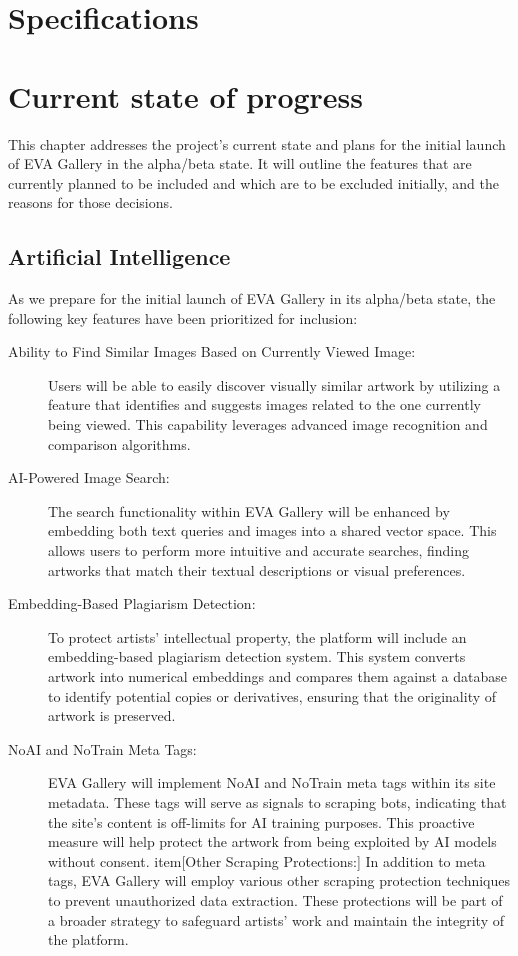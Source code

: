 \newpage

\chapter{Specifications}

\chapter{Current state of progress}
This chapter addresses the project's current state and plans for the initial launch of EVA Gallery in the alpha/beta state. It will outline the features that are currently planned to be included and which are to be excluded initially, and the reasons for those decisions.

\section{Artificial Intelligence}

As we prepare for the initial launch of EVA Gallery in its alpha/beta state, the following key features have been prioritized for inclusion:

\begin{description}
    \item[Ability to Find Similar Images Based on Currently Viewed Image:] Users will be able to easily discover visually similar artwork by utilizing a feature that identifies and suggests images related to the one currently being viewed. This capability leverages advanced image recognition and comparison algorithms.
    \item[AI-Powered Image Search:] The search functionality within EVA Gallery will be enhanced by embedding both text queries and images into a shared vector space. This allows users to perform more intuitive and accurate searches, finding artworks that match their textual descriptions or visual preferences.
    \item[Embedding-Based Plagiarism Detection:] To protect artists’ intellectual property, the platform will include an embedding-based plagiarism detection system. This system converts artwork into numerical embeddings and compares them against a database to identify potential copies or derivatives, ensuring that the originality of artwork is preserved.
    \item[NoAI and NoTrain Meta Tags:] EVA Gallery will implement NoAI and NoTrain meta tags within its site metadata. These tags will serve as signals to scraping bots, indicating that the site’s content is off-limits for AI training purposes. This proactive measure will help protect the artwork from being exploited by AI models without consent.
    item[Other Scraping Protections:] In addition to meta tags, EVA Gallery will employ various other scraping protection techniques to prevent unauthorized data extraction. These protections will be part of a broader strategy to safeguard artists' work and maintain the integrity of the platform.
\end{description}

